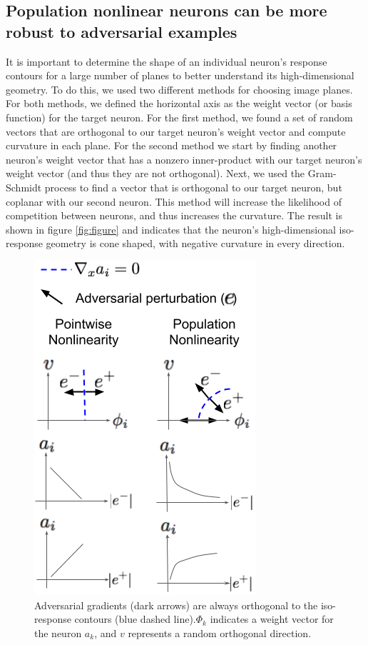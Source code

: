 \subsection{Population nonlinear neurons can be more robust to adversarial examples}
It is important to determine the shape of an individual neuron’s response contours for a large number of planes to better understand its high-dimensional geometry.  To do this, we used two different methods for choosing image planes. For both methods, we defined the horizontal axis as the weight vector (or basis function) for the target neuron. For the first method, we found a set of random vectors that are orthogonal to our target neuron’s weight vector and compute curvature in each plane. For the second method we start by finding another neuron’s weight vector that has a nonzero inner-product with our target neuron’s weight vector (and thus they are not orthogonal). Next, we used the Gram-Schmidt process to find a vector that is orthogonal to our target neuron, but coplanar with our second neuron. This method will increase the likelihood of competition between neurons, and thus increases the curvature. The result is shown in figure \ref{fig:figure} and indicates that the neuron’s high-dimensional iso-response geometry is cone shaped, with negative curvature in every direction.

\begin{figure}\label{fig:ch4_adv_grads}
\begin{center}
\centerline{\includegraphics[width=0.5\columnwidth]{figures/adversarial_gradients_iso_contours.png}}
\end{center}
\caption{Adversarial gradients (dark arrows) are always orthogonal to the iso-response contours (blue dashed line).$\Phi_{k}$ indicates a weight vector for the neuron $a_{k}$, and $v$ represents a random orthogonal direction.}
\end{figure}

